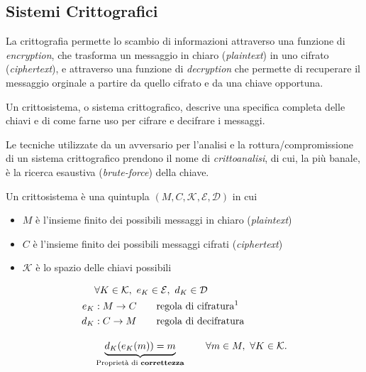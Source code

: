 \subsection{Sistemi Crittografici}
La crittografia permette lo scambio di informazioni attraverso una funzione di \emph{encryption}, che trasforma un messaggio in chiaro (\emph{plaintext}) in uno cifrato (\emph{ciphertext}), e attraverso una funzione di \emph{decryption} che permette di recuperare il messaggio orginale a partire da quello cifrato e da una chiave opportuna. 

\vspace{1em} \noindent Un crittosistema, o sistema crittografico, descrive una specifica completa delle chiavi e di come farne uso per cifrare e decifrare i messaggi. 

\vspace{1em} \noindent Le tecniche utilizzate da un avversario per l'analisi e la rottura/compromissione di un sistema crittografico prendono il nome di \emph{crittoanalisi}, di cui, la più banale, è la ricerca esaustiva (\emph{brute-force}) della chiave.

\begin{definition}
Un crittosistema è una quintupla
$(M,C,\mathcal{K},\mathcal{E},\mathcal{D})$ in cui
\begin{itemize}
    \item $M$ è l'insieme finito dei possibili messaggi in chiaro
    (\emph{plaintext})
    \item $C$ è l'insieme finito dei possibili messaggi cifrati
    (\emph{ciphertext})
    \item $\mathcal{K}$ è lo spazio delle chiavi possibili
\end{itemize}

\begin{align*}
    &\forall K \in \mathcal{K},\
    e_K \in \mathcal{E},\ d_K \in \mathcal{D}\\
    e_K &: M \to C \qquad \text{regola di cifratura\footnotemark}\\
    d_K &: C \to M \qquad \text{regola di decifratura}\\[1em]
    &\underbrace{d_K(e_K(m))=m}_{\text{Proprietà di \textbf{correttezza}}}
    \qquad \forall m \in M,\ \forall K \in \mathcal{K}.
\end{align*}


\end{definition}

